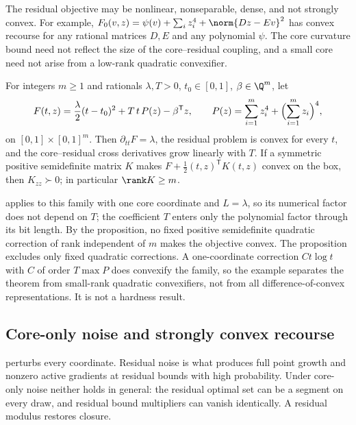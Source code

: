 The residual objective may be nonlinear, nonseparable, dense, and not
strongly convex. For example,
$F_0(v,z)=\psi(v)+\sum_iz_i^4+\norm{Dz-Ev}^2$ has convex recourse for any
rational matrices $D,E$ and any polynomial $\psi$. The core curvature bound
need not reflect the size of the core--residual coupling, and a small core
need not arise from a low-rank quadratic convexifier.

\begin{proposition}\label{prop:rec:rank}
For integers $m\ge1$ and rationals $\lambda,T>0$, $t_0\in[0,1]$,
$\beta\in\Q^m$, let
\[
 F(t,z)=\frac\lambda2(t-t_0)^2+T\,t\,P(z)-\beta^{\mathsf T}z,\qquad
 P(z)=\sum_{i=1}^mz_i^4+\Bigl(\sum_{i=1}^mz_i\Bigr)^4,
\]
on $[0,1]\times[0,1]^m$. Then $\partial_{tt}F=\lambda$, the residual problem
is convex for every $t$, and the core--residual cross derivatives grow
linearly with $T$. If a symmetric positive semidefinite matrix $K$ makes
$F+\frac12(t,z)^{\mathsf T}K(t,z)$ convex on the box, then $K_{zz}\succ0$; in
particular $\rank K\ge m$.
\end{proposition}

 applies to this family with one core coordinate and
$L=\lambda$, so its numerical factor does not depend on $T$; the
coefficient $T$ enters only the polynomial factor through its bit length.
By the proposition, no fixed positive semidefinite quadratic correction of
rank independent of $m$ makes the objective convex. The proposition
excludes only fixed quadratic corrections. A one-coordinate correction
$Ct\log t$ with $C$ of order $T\max P$ does convexify the family, so the
example separates the theorem from small-rank quadratic convexifiers, not
from all difference-of-convex representations. It is not a hardness
result.

\subsection{Core-only noise and strongly convex recourse}\label{sec:rec:core-only}

 perturbs every coordinate. Residual noise is what
produces full point growth and nonzero active gradients at residual bounds
with high probability. Under core-only noise neither holds in general: the
residual optimal set can be a segment on every draw, and residual bound
multipliers can vanish identically. A residual modulus restores closure.

